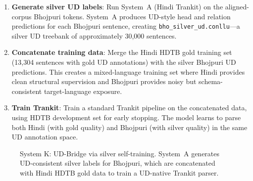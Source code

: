 \documentclass[12pt,a4paper,oneside]{report}
\begin{document}
\begin{enumerate}
  \item \textbf{Generate silver UD labels}: Run System~A (Hindi Trankit) on the
        aligned-corpus Bhojpuri tokens. System~A produces UD-style head and relation
        predictions for each Bhojpuri sentence, creating
        \texttt{bho\_silver\_ud.conllu}---a silver UD treebank of approximately
        30,000 sentences.

  \item \textbf{Concatenate training data}: Merge the Hindi HDTB gold training set
        (13,304 sentences with gold UD annotations) with the silver Bhojpuri UD
        predictions. This creates a mixed-language training set where Hindi provides
        clean structural supervision and Bhojpuri provides noisy but schema-consistent
        target-language exposure.

  \item \textbf{Train Trankit}: Train a standard Trankit pipeline on the concatenated
        data, using HDTB development set for early stopping. The model learns to parse
        both Hindi (with gold quality) and Bhojpuri (with silver quality) in the same
        UD annotation space.
\end{enumerate}

\begin{figure}[ht]
\centering
{}
\caption{System K: UD-Bridge via silver self-training. System~A generates UD-consistent silver labels for Bhojpuri, which are concatenated with Hindi HDTB gold data to train a UD-native Trankit parser.}
\label{fig:system_k}
\end{figure}
\end{document}
